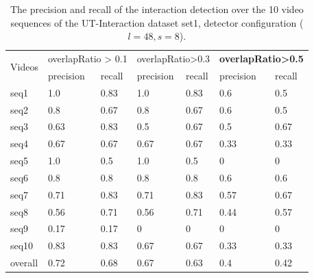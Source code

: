 \begin{table}
	\caption{The precision and recall of the interaction detection over the 10 video sequences of the UT-Interaction dataset set1, detector configuration (\(l=48, s=8\)).}
	\begin{center}
		\begin{tabular}{| m{2cm} || m{1.5cm} | m{1.5cm} | m{1.5cm} | m{1.5cm} | m{1.5cm} | m{1.5cm} |}
			\hline
			\multirow{2}{*}{Videos} & \multicolumn{2}{c|}{overlapRatio > 0.1} & \multicolumn{2}{c|}{overlapRatio>0.3} & \multicolumn{2}{c|}{\textbf{overlapRatio>0.5}} \\ \cline{2-7}
			 & precision & recall & precision & recall & precision & recall \\ \hline \hline
			 
			 seq1 & 1.0   & 0.83  & 1.0   & 0.83 & 0.6  & 0.5 \\ \hline
			 seq2 & 0.8   & 0.67  & 0.8   & 0.67 & 0.6  & 0.5 \\ \hline
			 seq3 & 0.63  & 0.83  & 0.5   & 0.67 & 0.5  & 0.67 \\ \hline
			 seq4 & 0.67  & 0.67  & 0.67  & 0.67 & 0.33 & 0.33 \\ \hline
			 seq5 & 1.0   & 0.5   & 1.0   & 0.5  & 0    &  0   \\ \hline
			 seq6 & 0.8   & 0.8   & 0.8   & 0.8  & 0.6  & 0.6  \\ \hline
			 seq7 & 0.71  & 0.83  & 0.71  & 0.83 & 0.57 & 0.67 \\ \hline
			 seq8 & 0.56  & 0.71  & 0.56  & 0.71 & 0.44 & 0.57 \\ \hline
			 seq9 & 0.17  & 0.17  & 0     & 0    & 0    & 0    \\ \hline
			 seq10 & 0.83 & 0.83  & 0.67  & 0.67 & 0.33 & 0.33 \\ \hline
			 overall & 0.72 & 0.68 & 0.67 & 0.63 & 0.4  & 0.42 \\ \hline	 
		\end{tabular}
		\label{table:pr}
	\end{center}
\end{table}


